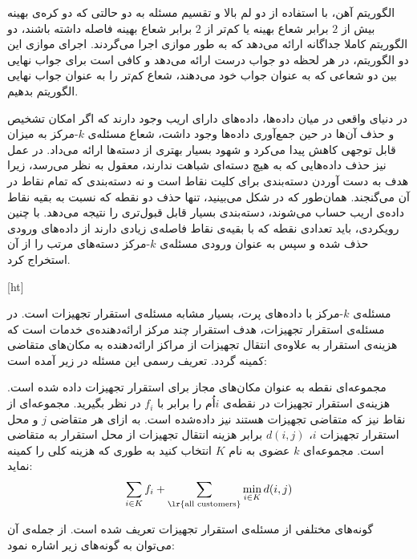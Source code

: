 
الگوریتم آهن، با استفاده از دو لم بالا و تقسیم مسئله به دو حالتی که دو کره‌ی بهینه بیش از $2$ برابر شعاع بهینه یا کم‌تر از $2$ برابر شعاع بهینه فاصله داشته باشند، دو الگوریتم کاملا جداگانه ارائه می‌دهد که به طور موازی اجرا می‌گردند.
اجرای موازی این دو الگوریتم، در هر لحظه دو جواب درست ارائه می‌دهد و کافی است برای جواب نهایی بین دو شعاعی که به عنوان جواب خود می‌دهند، شعاع کم‌تر را به عنوان جواب نهایی الگوریتم بدهیم.


در دنیای واقعی در میان داده‌ها، داده‌های دارای اریب‌ وجود دارند که اگر امکان تشخیص و حذف آن‌ها در حین جمع‌آوری داده‌ها وجود داشت، شعاع مسئله‌ی $k$-مرکز به میزان قابل توجهی کاهش پیدا می‌کرد و شهود بسیار بهتری از دسته‌ها ارائه می‌داد.
در عمل نیز حذف داده‌هایی که به هیچ دسته‌ای شباهت ندارند، معقول به نظر می‌رسد، زیرا هدف به دست آوردن دسته‌بندی برای کلیت نقاط است و نه دسته‌بندی که تمام نقاط در آن می‌گنجند.
همان‌طور که در شکل  می‌بینید، تنها حذف دو نقطه که نسبت به بقیه نقاط داده‌ی اریب حساب می‌شوند، دسته‌بندی بسیار قابل قبول‌تری  را نتیجه می‌دهد.
با چنین رویکردی، باید تعدادی نقطه که با بقیه‌ی نقاط فاصله‌ی زیادی دارند از داده‌های ورودی حذف شده و سپس به عنوان ورودی مسئله‌ی $k$-مرکز دسته‌های مرتب را از آن استخراج کرد. 

[ht]

مسئله‌ی $k$-مرکز با داده‌های پرت، بسیار مشابه مسئله‌ی استقرار تجهیزات است.
در مسئله‌ی استقرار تجهیزات، هدف استقرار چند مرکز ارائه‌دهنده‌ی خدمات است که هزینه‌ی استقرار به علاوه‌ی انتقال تجهیزات از مراکز ارائه‌دهنده به مکان‌های متقاضی کمینه گردد.
تعریف رسمی این مسئله در زیر آمده است:

مجموعه‌ای نقطه به عنوان مکان‌های مجاز برای استقرار تجهیزات داده شده است.
هزینه‌ی استقرار تجهیزات در نقطه‌ی $i$اُم را برابر با $f_i$ در نظر بگیرید.
مجموعه‌ای از نقاط نیز که متقاضی تجهیزات هستند نیز داده‌شده است.
به ازای هر متقاضی $j$ و محل استقرار تجهیزات $i$، $d(i, j)$ برابر هزینه انتقال تجهیزات از محل استقرار به متقاضی است.
مجموعه‌ای $k$ عضوی به نام $K$ انتخاب کنید به طوری که هزینه کلی را کمینه نماید:
$$\sum_{i \in K} f_i + \sum_{\lr{\text{all customers}}}{\min_{i \in K} d(i, j)}$$


 گونه‌های مختلفی از مسئله‌ی استقرار تجهیزات تعریف شده است.
از جمله‌ی آن می‌توان به گونه‌های زیر اشاره نمود:

